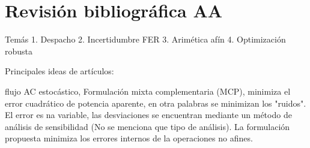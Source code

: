 \chapter{Revisión bibliográfica AA}

Temás
1. Despacho 
2. Incertidumbre FER
3. Arimética afín
4. Optimización robusta

Principales ideas de artículos:

\cite{Caniz-AAstoch-2012} flujo AC estocástico, Formulación mixta complementaria (MCP), minimiza el error cuadrático de potencia aparente, en otra palabras se minimizan los "ruidos". El error es na variable, las desviaciones se encuentran mediante un método de análisis de sensibilidad (No se menciona que tipo de análisis). La formulación propuesta minimiza los errores internos de la operaciones no afines.
